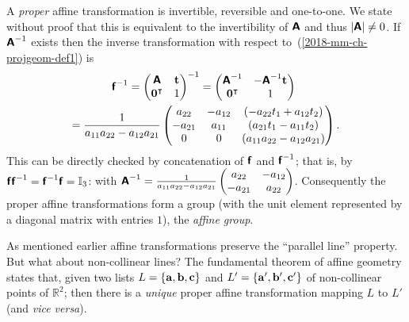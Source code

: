 A {\em proper} affine transformation is invertible, reversible and one-to-one.
We state without proof that this is equivalent to the
invertibility of $\textsf{\textbf{A}}$  and thus  $\left| \textsf{\textbf{A}} \right| \neq 0$.
If $\textsf{\textbf{A}}^{-1}$ exists then
the inverse transformation with respect to~(\ref{2018-mm-ch-projgeom-def1})    is
\begin{equation}
\begin{split}
\textsf{\textbf{f}}^{-1}     =
\begin{pmatrix}
\textsf{\textbf{A}}&{\bf t}\\
{\bf 0}^\intercal &1
\end{pmatrix}^{-1}
=
\begin{pmatrix}
\textsf{\textbf{A}}^{-1} &-\textsf{\textbf{A}}^{-1} {\bf t}\\
{\bf 0}^\intercal &1
\end{pmatrix}
 \qquad    \qquad
\\
=
\frac{1}{a_{11}a_{22}-a_{12}a_{21}}
\begin{pmatrix}
a_{22}&-a_{12} & (- a_{22} t_1 + a_{12}t_2)\\
-a_{21}&a_{11} &   (a_{21} t_1 - a_{11}t_2)\\
0&0 &(a_{11}a_{22}-a_{12}a_{21})
\end{pmatrix}
.
\end{split}
\label{2018-mm-ch-projgeom-def1inv}
\end{equation}
This can be
directly
checked by concatenation of
$\textsf{\textbf{f}}$ and $\textsf{\textbf{f}}^{-1}$; that is, by
$\textsf{\textbf{f}} \textsf{\textbf{f}}^{-1}=\textsf{\textbf{f}}^{-1} \textsf{\textbf{f}}=\mathbb{I}_3$:
with
$\textsf{\textbf{A}}^{-1} = \frac{1}{a_{11}a_{22}-a_{12}a_{21}}\begin{pmatrix}
a_{22}&-a_{12}\\
-a_{21}&a_{22}
\end{pmatrix}$.
Consequently the proper affine transformations form a group (with the unit element represented by a diagonal matrix with entries $1$), the {\em affine group}.

As mentioned earlier affine transformations preserve
the ``parallel line'' property. But what about non-collinear lines?
The fundamental theorem of affine geometry  \cite{Stothers-ag}
states that,
given two lists
$L=\{{\bf a},{\bf b},{\bf c}\}$
and
$L'=\{{\bf a}',{\bf b}',{\bf c}'\}$
of non-collinear
points of $\mathbb{R}^2$;
then there is a {\em unique}  proper affine transformation  mapping $L$ to $L'$ (and {\it vice versa}).

